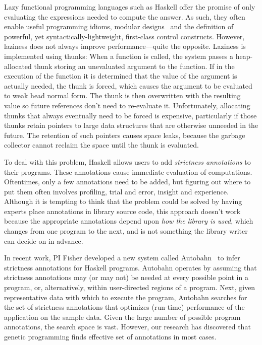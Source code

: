 Lazy functional programming languages such as
Haskell offer the promise of only evaluating the expressions needed
to compute the answer. As such, they often enable useful programming
idioms, modular designs~\cite{Hughes89} and the definition of powerful,
yet syntactically-lightweight, first-class control constructs.
However, laziness does not always improve performance---quite the
opposite.  Laziness is implemented using thunks: When a function is called, the
system passes a heap-allocated thunk storing an unevaluated argument to
the function. If in the execution of the function it is determined that
the value of the argument is actually needed, the thunk is forced,
which causes the argument to be evaluated to weak head normal
form. The thunk is then overwritten with the resulting value so future
references don't need to re-evaluate it.  Unfortunately,
allocating thunks that always eventually need to be forced is expensive,
particularly if those thunks retain pointers to large data structures
that are otherwise unneeded in the future.  The retention of such
pointers causes space leaks, because the garbage collector cannot
reclaim the space until the thunk is evaluated.

To deal with this problem, Haskell allows users to add
\emph{strictness annotations} to their programs.  These annotations
cause immediate evaluation of computations. Oftentimes, only a few
annotations need to be added, but figuring out where to put them often
involves profiling, trial and error, insight and experience.  Although
it is tempting to think that the problem could be solved by having
experts place annotations in library source code, this approach
doesn't work because the appropriate annotations depend upon
\textit{how the library is used}, which changes from one program to
the next, and is not something the library writer can decide on in
advance.

In recent work, PI Fisher developed a new system called Autobahn~\cite{autobahn}
to infer strictness annotations for Haskell programs.  Autobahn
operates by assuming that strictness annotations may (or may not) be
needed at every possible point in a program, or, alternatively, within
user-directed regions of a program.  Next, given representative data with which to
execute the program, Autobahn searches for the set of strictness annotations
that optimizes (run-time) performance of the application on the sample data.
Given the large number of possible program annotations, the search space is
vast.  However, our research has discovered that genetic programming finds
effective set of annotations in most cases.

